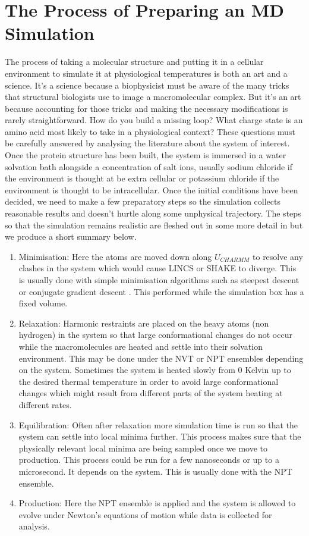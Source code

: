 	\section{The Process of Preparing an MD Simulation}
	The process of taking a molecular structure and putting it in a cellular environment to simulate it at physiological temperatures is both an art and a science. It's a science because a biophysicist must be aware of the many tricks that structural biologists use to image a macromolecular complex. But it's an art because accounting for those tricks and making the necessary modifications is rarely straightforward. How do you build a missing loop? What charge state is an amino acid most likely to take in a physiological context? These questions must be carefully answered by analysing the literature about the system of interest. Once the protein structure has been built, the system is immersed in a water solvation bath alongside a concentration of salt ions, usually sodium chloride if the environment is thought at be extra cellular or potassium chloride if the environment is thought to be intracellular. Once the initial conditions have been decided, we need to make a few preparatory steps so the simulation collects reasonable results and doesn't hurtle along some unphysical trajectory. The steps so that the simulation remains realistic are fleshed out in some more detail in \cite{braun2019} but we produce a short summary below.

	\begin{enumerate}
		\item Minimisation: Here the atoms are moved down along $U_{CHARMM}$ to resolve any clashes in the system which would cause LINCS or SHAKE to diverge. This is usually done with simple minimisation algorithms such as steepest descent or conjugate gradient descent \cite{leach2001}. This performed while the simulation box has a fixed volume. 
	\item Relaxation: Harmonic restraints are placed on the heavy atoms (non hydrogen) in the system so that large conformational changes do not occur while the macromolecules are heated and settle into their solvation environment. This may be done under the NVT or NPT ensembles depending on the system. Sometimes the system is heated slowly from 0 Kelvin up to the desired thermal temperature in order to avoid large conformational changes which might result from different parts of the system heating at different rates. 
\item Equilibration: Often after relaxation more simulation time is run so that the system can settle into local minima further. This process makes sure that the physically relevant local minima are being sampled once we move to production. This process could be run for a few nanoseconds or up to a microsecond. It depends on the system. This is usually done with the NPT ensemble.
\item Production: Here the NPT ensemble is applied and the system is allowed to evolve under Newton's equations of motion while data is collected for analysis.
\end{enumerate}


